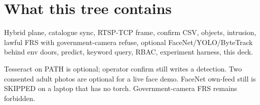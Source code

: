 \documentclass[listings]{csf301-notes}
\begin{document}
\section{What this tree contains}
Hybrid plane, catalogue sync, RTSP-TCP frame, confirm CSV, objects, intrusion, lawful FRS with government-camera refuse, optional FaceNet/YOLO/ByteTrack behind env doors, predict, keyword query, RBAC, experiment harness, this deck.

Tesseract on PATH is optional; operator confirm still writes a detection. Two consented adult photos are optional for a live face demo. FaceNet own-feed still is SKIPPED on a laptop that has no torch. Government-camera FRS remains forbidden.
\end{document}
